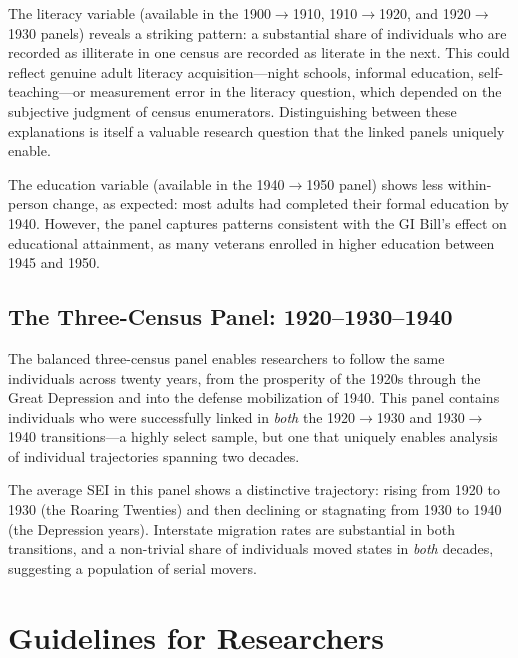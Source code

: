 \documentclass[12pt]{article}
\begin{document}
The literacy variable (available in the 1900$\rightarrow$1910, 1910$\rightarrow$1920, and 1920$\rightarrow$1930 panels) reveals a striking pattern: a substantial share of individuals who are recorded as illiterate in one census are recorded as literate in the next. This could reflect genuine adult literacy acquisition---night schools, informal education, self-teaching---or measurement error in the literacy question, which depended on the subjective judgment of census enumerators. Distinguishing between these explanations is itself a valuable research question that the linked panels uniquely enable.

The education variable (available in the 1940$\rightarrow$1950 panel) shows less within-person change, as expected: most adults had completed their formal education by 1940. However, the panel captures patterns consistent with the GI Bill's effect on educational attainment, as many veterans enrolled in higher education between 1945 and 1950.

\subsection{The Three-Census Panel: 1920--1930--1940}

The balanced three-census panel enables researchers to follow the same individuals across twenty years, from the prosperity of the 1920s through the Great Depression and into the defense mobilization of 1940. This panel contains individuals who were successfully linked in \textit{both} the 1920$\rightarrow$1930 and 1930$\rightarrow$1940 transitions---a highly select sample, but one that uniquely enables analysis of individual trajectories spanning two decades.

The average SEI in this panel shows a distinctive trajectory: rising from 1920 to 1930 (the Roaring Twenties) and then declining or stagnating from 1930 to 1940 (the Depression years). Interstate migration rates are substantial in both transitions, and a non-trivial share of individuals moved states in \textit{both} decades, suggesting a population of serial movers.


\section{Guidelines for Researchers}\label{sec:guidelines}
\end{document}
